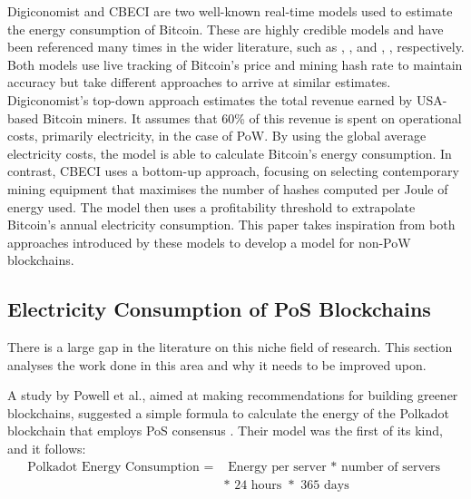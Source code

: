  Digiconomist \cite{BitcoinDigiconomist} and CBECI \cite{CambridgeCBECI} are two well-known real-time models used to estimate the energy consumption of Bitcoin. These are highly credible models and have been referenced many times in the wider literature, such as \cite{Cole2018ModelingAlgorithms}, \cite{Lei2021BestRecommendations}, and \cite{Erdogan2022AnalyzingSustainability}, \cite{Platt2022TheProof-of-Work}, respectively. Both models use live tracking of Bitcoin's price and mining hash rate to maintain accuracy but take different approaches to arrive at similar estimates. Digiconomist's top-down approach estimates the total revenue earned by USA-based Bitcoin miners. It assumes that 60\% of this revenue is spent on operational costs, primarily electricity, in the case of PoW. By using the global average electricity costs, the model is able to calculate Bitcoin's energy consumption. In contrast, CBECI uses a bottom-up approach, focusing on selecting contemporary mining equipment that maximises the number of hashes computed per Joule of energy used. The model then uses a profitability threshold to extrapolate Bitcoin's annual electricity consumption. This paper takes inspiration from both approaches introduced by these models to develop a model for non-PoW blockchains.







\subsection{ Electricity Consumption of PoS Blockchains }
\label{LitRevExistingModels}

There is a large gap in the literature on this niche field of research. This section analyses the work done in this area and why it needs to be improved upon.

A study by Powell et al., aimed at making recommendations for building greener blockchains, suggested a simple formula to calculate the energy of the Polkadot blockchain that employs PoS consensus \cite{Powell2021AWARENESSBLOCKCHAIN}. Their model was the first of its kind, and it follows: 
\begin{align}
   \boldsymbol{\mathrm{\text{Polkadot Energy Consumption } = }}
   &\boldsymbol{\mathrm{\text{ Energy per server }* \text{ number of servers } } } \nonumber\\
   &\boldsymbol{\mathrm{* \text{ 24 hours } *\text{ 365 days }}} \nonumber
\end{align}


